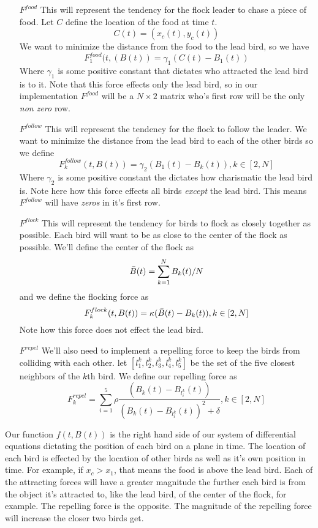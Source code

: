 \documentclass[12pt]{article}
\begin{document}
\begin{itemize}
    \item[$F^{food}$]  This will represent the tendency for the flock leader to chase a piece of food.
    Let $C$ define the location of the food at time $t$.
    $$C(t) = (x_c(t),y_c(t))$$
    We want to minimize the distance from the food to the lead bird, so we have
    $$F^{food}_1(t,(B(t)) = \gamma_1(C(t)-B_1(t))$$
    Where $\gamma_1$ is some positive constant that dictates who attracted the lead bird is to it.
    Note that this force effects only the lead bird, so in our implementation $F^{food}$ will be a $N \times 2$ matrix who's first row will be the only \textit{non zero} row.
    
    \item[$F^{follow}$] This will represent the tendency for the flock to follow the leader. We want to minimize the distance from the lead bird to each of the other birds so we define
    $$F^{follow}_k(t,B(t)) = \gamma_2(B_1(t) - B_k(t)), k \in [2,N]$$
    Where $\gamma_2$ is some positive constant the dictates how charismatic the lead bird is.
    Note here how this force effects all birds \textit{except} the lead bird. This means $F^{follow}$ will have \textit{zeros} in it's first row.
    
    \item[$F^{flock}$] This will represent the tendency for birds to flock as closely together as possible. Each bird will want to be as close to the center of the flock as possible. We'll define the center of the flock as 
    $$\Bar{B}(t) = \sum_{k=1}^N B_k(t)/N$$
    and we define the flocking force as
    $$F_k^{flock}(t,B(t)) = \kappa(\Bar{B}(t) - B_k(t)), k \in [2,N]$$
    Note how this force does not effect the lead bird.
    
    \item[$F^{repel}$] We'll also need to implement a repelling force to keep the birds from colliding with each other. let $[l^k_1,l^k_2,l^k_3,l^k_4,l^k_5]$ be the set of the five closest neighbors of the $k$th bird. We define our repelling force as
    $$F_k^{repel} = \sum_{i=1}^5 \rho\frac{(B_k(t)-B_{l_i^k}(t))}{(B_k(t)-B_{l_i^k}(t))^2 + \delta}, k \in [2,N]$$
    
\end{itemize}

Our function $f(t,B(t))$ is the right hand side of our system of differential equations dictating the position of each bird on a plane in time. The location of each bird is effected by the location of other birds as well as it's own position in time. For example, if $x_c > x_1$, that means the food is above the lead bird. Each of the attracting forces will have a greater magnitude the further each bird is from the object it's attracted to, like the lead bird, of the center of the flock, for example. The repelling force is the opposite. The magnitude of the repelling force will increase the closer two birds get.
\end{document}
